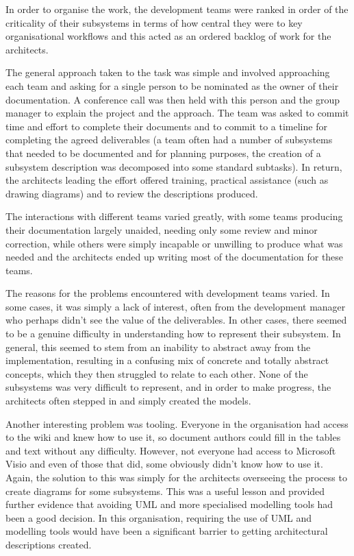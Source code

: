   In order to organise the work, the development teams were ranked in order of the criticality of their subsystems in terms of how central they were to key organisational workflows and this acted as an ordered backlog of work for the architects.

  The general approach taken to the task was simple and involved approaching each team and asking for a single person to be nominated as the owner of their documentation.  A conference call was then held with this person and the group manager to explain the project and the approach.  The team was asked to commit time and effort to complete their documents and to commit to a timeline for completing the agreed deliverables (a team often had a number of subsystems that needed to be documented and for planning purposes, the creation of a subsystem description was decomposed into some standard subtasks).  In return, the architects leading the effort offered training, practical assistance (such as drawing diagrams) and to review the descriptions produced.

  The interactions with different teams varied greatly, with some teams producing their documentation largely unaided, needing only some review and minor correction, while others were simply incapable or unwilling to produce what was needed and the architects ended up writing most of the documentation for these teams. 

  The reasons for the problems encountered with development teams varied.  In some cases, it was simply a lack of interest, often from the development manager who perhaps didn't see the value of the deliverables.  In other cases, there seemed to be a genuine difficulty in understanding how to represent their subsystem.  In general, this seemed to stem from an inability to abstract away from the implementation, resulting in a confusing mix of concrete and totally abstract concepts, which they then struggled to relate to each other.  None of the subsystems was very difficult to represent, and in order to make progress, the architects often stepped in and simply created the models.

  Another interesting problem was tooling.  Everyone in the organisation had access to the wiki and knew how to use it, so document authors could fill in the tables and text without any difficulty.  However, not everyone had access to Microsoft Visio and even of those that did, some obviously didn't know how to use it.  Again, the solution to this was simply for the architects overseeing the process to create diagrams for some subsystems.  This was a useful lesson and provided further evidence that avoiding UML and more specialised modelling tools had been a good decision.  In this organisation, requiring the use of UML and modelling tools would have been a significant barrier to getting architectural descriptions created.

